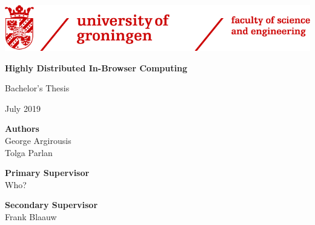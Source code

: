 \begin{titlepage}
    \begin{center}
        \vspace*{1cm}
 
        \includegraphics{fse_logo}

		\vspace*{3cm}

        \Huge
        \textbf{Highly Distributed In-Browser Computing}
 
        \vspace{0.5cm}

        \LARGE
        Bachelor's Thesis
        
        \vspace{0.5cm}
        July 2019

        \vfill 
    \end{center}
        
\large
\noindent \textbf{Authors}\\
George Argirousis\\
Tolga Parlan
\vspace{0.5cm}

\noindent \textbf{Primary Supervisor}\\
Who?
\vspace{0.5cm}

\noindent \textbf{Secondary Supervisor}\\
Frank Blaauw
\end{titlepage}